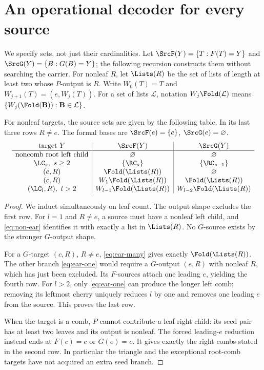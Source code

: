 \section{An operational decoder for every source}\label{sec:sources}

We specify sets, not just their cardinalities. Let
\(\SrcF(Y)=\{T:F(T)=Y\}\) and \(\SrcG(Y)=\{B:G(B)=Y\}\);
the following recursion constructs them without searching the carrier.
For nonleaf \(R\), let \(\Lists(R)\) be the set of lists of length at
least two whose \(P\)-output is \(R\). Write \(W_0(T)=T\) and
\(W_{j+1}(T)=(e,W_j(T))\). For a set of lists \(\mathcal L\), notation
\(W_j\Fold(\mathcal L)\) means
\(\{W_j(\Fold(\mathbf B)):\mathbf B\in\mathcal L\}\).

\begin{lemma}\label{lem:inverse-boundaries}
For nonleaf targets, the source sets are given by the following table.
In its last three rows \(R\ne e\). The formal bases are
\(\SrcF(e)=\{e\}\), \(\SrcG(e)=\varnothing\).
\[
\begin{array}{c|c|c}
 \text{target }Y&\SrcF(Y)&\SrcG(Y)\\ \hline
 \text{noncomb root left child}&\varnothing&\varnothing\\
 \LC_s,\ s\ge2&\{\RC_s\}&\{\RC_{s-1}\}\\
 (e,R)&\Fold(\Lists(R))&\varnothing\\
 (c,R)&W_1\Fold(\Lists(R))&\Fold(\Lists(R))\\
 (\LC_l,R),\ l>2&W_{l-1}\Fold(\Lists(R))&
                         W_{l-2}\Fold(\Lists(R))
\end{array}
\]
\end{lemma}

\begin{proof}
We induct simultaneously on leaf count. The output shape excludes the
first row. For \(l=1\) and \(R\ne e\), a source must have a nonleaf left
child, and \eqref{eq:non-ear} identifies it with exactly a list in
\(\Lists(R)\). No \(G\)-source exists by the stronger \(G\)-output shape.

For a \(G\)-target \((c,R)\), \(R\ne e\),
\eqref{eq:ear-many} gives exactly \(\Fold(\Lists(R))\).
The other branch \eqref{eq:ear-one} would require a \(G\)-output
\((e,R)\) with nonleaf \(R\), which has just been excluded. Its
\(F\)-sources attach one leading \(e\), yielding the fourth row.
For \(l>2\), only \eqref{eq:ear-one} can produce the longer left comb;
removing its leftmost cherry uniquely reduces \(l\) by one and removes
one leading \(e\) from the source. This proves the last row.

When the target is a comb, \(P\) cannot contribute a leaf right child:
its seed pair has at least two leaves and its output is nonleaf. The
forced leading-\(e\) reduction instead ends at \(F(c)=c\) or \(G(e)=c\).
It gives exactly the right combs stated in the second row. In particular
the triangle and the exceptional root-comb targets have not acquired an
extra seed branch.
\end{proof}

